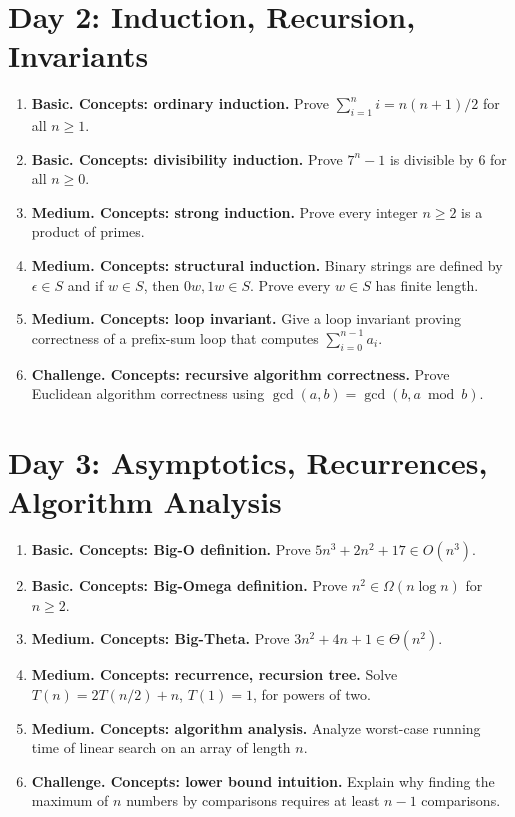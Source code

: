 \documentclass[11pt]{article}
\begin{document}
\section{Day 2: Induction, Recursion, Invariants}
\begin{enumerate}[label=\textbf{2.\arabic*.}]
\item \textbf{Basic. Concepts: ordinary induction.} Prove $\sum_{i=1}^n i=n(n+1)/2$ for all $n\ge1$.
\item \textbf{Basic. Concepts: divisibility induction.} Prove $7^n-1$ is divisible by $6$ for all $n\ge0$.
\item \textbf{Medium. Concepts: strong induction.} Prove every integer $n\ge2$ is a product of primes.
\item \textbf{Medium. Concepts: structural induction.} Binary strings are defined by $\epsilon\in S$ and if $w\in S$, then $0w,1w\in S$. Prove every $w\in S$ has finite length.
\item \textbf{Medium. Concepts: loop invariant.} Give a loop invariant proving correctness of a prefix-sum loop that computes $\sum_{i=0}^{n-1}a_i$.
\item \textbf{Challenge. Concepts: recursive algorithm correctness.} Prove Euclidean algorithm correctness using $\gcd(a,b)=\gcd(b,a\bmod b)$.
\end{enumerate}

\section{Day 3: Asymptotics, Recurrences, Algorithm Analysis}
\begin{enumerate}[label=\textbf{3.\arabic*.}]
\item \textbf{Basic. Concepts: Big-O definition.} Prove $5n^3+2n^2+17\in O(n^3)$.
\item \textbf{Basic. Concepts: Big-Omega definition.} Prove $n^2\in\Omega(n\log n)$ for $n\ge2$.
\item \textbf{Medium. Concepts: Big-Theta.} Prove $3n^2+4n+1\in\Theta(n^2)$.
\item \textbf{Medium. Concepts: recurrence, recursion tree.} Solve $T(n)=2T(n/2)+n$, $T(1)=1$, for powers of two.
\item \textbf{Medium. Concepts: algorithm analysis.} Analyze worst-case running time of linear search on an array of length $n$.
\item \textbf{Challenge. Concepts: lower bound intuition.} Explain why finding the maximum of $n$ numbers by comparisons requires at least $n-1$ comparisons.
\end{enumerate}
\end{document}
